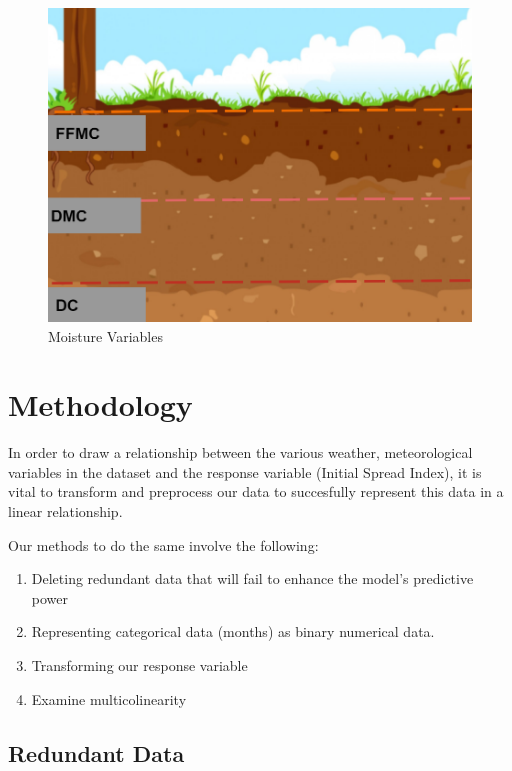 \documentclass[conference,final,]{IEEEtran}
\makeatletter
\def\maxwidth{\ifdim\Gin@nat@width>\linewidth\linewidth
\else\Gin@nat@width\fi}
\let\Oldincludegraphics\includegraphics
\renewcommand{\includegraphics}[1]{\Oldincludegraphics[width=\maxwidth]{#1}}
\makeatother
\begin{document}
\begin{figure}
\centering
\includegraphics{moist.png}
\caption{Moisture Variables}
\end{figure}

\hypertarget{methodology}{%
\section{Methodology}\label{methodology}}

In order to draw a relationship between the various weather,
meteorological variables in the dataset and the response variable
(Initial Spread Index), it is vital to transform and preprocess our data
to succesfully represent this data in a linear relationship.

Our methods to do the same involve the following:

\begin{enumerate}
\def\labelenumi{\arabic{enumi}.}
\item
  Deleting redundant data that will fail to enhance the model's
  predictive power 
\item
  Representing categorical data (months) as binary numerical data. 
\item
  Transforming our response variable 
\item
  Examine multicolinearity 
\end{enumerate}

\hypertarget{redundant-data}{%
\subsection{Redundant Data}\label{redundant-data}}
\end{document}
